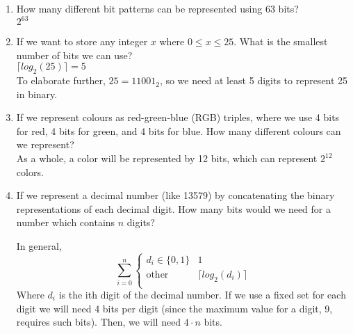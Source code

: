 \documentclass{article}
\begin{document}
\begin{enumerate}
  \item How many different bit patterns can be represented using 63 bits? \\
        $2^{63}$
  \item If we want to store any integer $x$ where $0 \leq x \leq 25$.
        What is the smallest number of bits we can use? \\
        $\lceil log_2(25) \rceil = 5$ \\
        To elaborate further, $25 = 11001_2$, so we need at least 5 digits to represent 25 in binary.
  \item If we represent colours as red-green-blue (RGB) triples, where we use 4 bits for red, 4 bits for
  green, and 4 bits for blue. How many different colours can we represent? \\
      As a whole, a color will be represented by 12 bits, which can represent $2^{12}$ colors.
  \item If we represent a decimal number (like 13579) by concatenating the binary representations of
  each decimal digit. How many bits would we need for a number which contains $n$ digits?

  In general,\\
  \begin{equation*}
   \sum_{i = 0}^{n}
      \begin{cases}
        d_i \in \{0, 1\}& 1\\
        \text{other} & \lceil log_2(d_i) \rceil \\
     \end{cases}
    \end{equation*}
  Where $d_i$ is the ith digit of the decimal number. If we use a fixed set for each digit
  we will need 4 bits per digit (since the maximum value for a digit, 9, requires such bits). Then, 
  we will need $4 \cdot n$ bits. \\

\end{enumerate}
\end{document}
